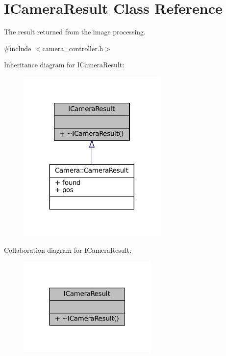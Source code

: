 \hypertarget{classICameraResult}{}\section{I\+Camera\+Result Class Reference}
\label{classICameraResult}


The result returned from the image processing.  




{\ttfamily \#include $<$camera\+\_\+controller.\+h$>$}



Inheritance diagram for I\+Camera\+Result\+:\nopagebreak
\begin{figure}[H]
\begin{center}
\leavevmode
\includegraphics[width=209pt]{classICameraResult__inherit__graph}
\end{center}
\end{figure}


Collaboration diagram for I\+Camera\+Result\+:\nopagebreak
\begin{figure}[H]
\begin{center}
\leavevmode
\includegraphics[width=195pt]{classICameraResult__coll__graph}
\end{center}
\end{figure}

